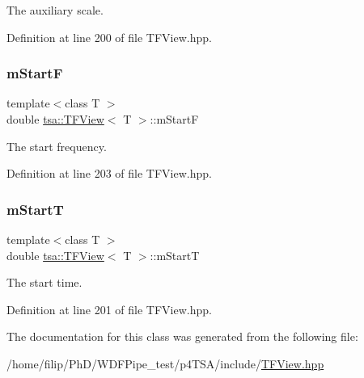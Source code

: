 The auxiliary scale. 



Definition at line 200 of file T\+F\+View.\+hpp.

\mbox{\label{classtsa_1_1_t_f_view_afd3043fa47a3c337b1eedcb5cad1aa63}} 
\subsubsection{\texorpdfstring{m\+StartF}{mStartF}}
{\footnotesize\ttfamily template$<$class T $>$ \\
double \hyperlink{classtsa_1_1_t_f_view}{tsa\+::\+T\+F\+View}$<$ T $>$\+::m\+StartF\hspace{0.3cm}{\ttfamily [protected]}}



The start frequency. 



Definition at line 203 of file T\+F\+View.\+hpp.

\mbox{\label{classtsa_1_1_t_f_view_a42d5dc9edb5b4d6c746d5c1a1614abb4}} 
\subsubsection{\texorpdfstring{m\+StartT}{mStartT}}
{\footnotesize\ttfamily template$<$class T $>$ \\
double \hyperlink{classtsa_1_1_t_f_view}{tsa\+::\+T\+F\+View}$<$ T $>$\+::m\+StartT\hspace{0.3cm}{\ttfamily [protected]}}



The start time. 



Definition at line 201 of file T\+F\+View.\+hpp.



The documentation for this class was generated from the following file\+:\begin{DoxyCompactItemize}
\item 
/home/filip/\+Ph\+D/\+W\+D\+F\+Pipe\+\_\+test/p4\+T\+S\+A/include/\hyperlink{_t_f_view_8hpp}{T\+F\+View.\+hpp}\end{DoxyCompactItemize}
